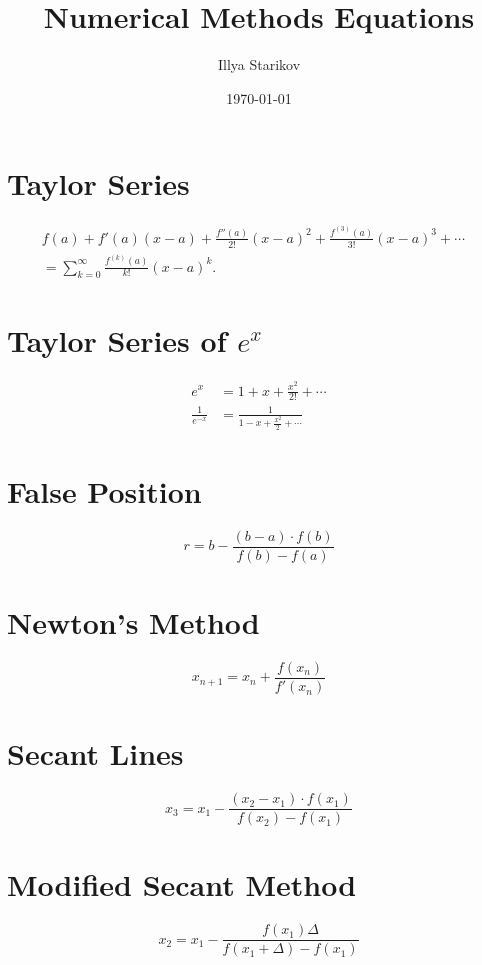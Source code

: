 \documentclass[11pt]{article}
\title{Numerical Methods Equations}
\date{\today}
\author{Illya Starikov}
\begin{document}
\maketitle

\section{Taylor Series}
\begin{align}
    f(a) + f'(a)(x - a) + \frac{f''(a)}{2!}(x - a)^2 + \frac{f^{(3)}(a)}{3!}(x - a)^3 + \cdots & \\ = \sum ^{\infty} _{k = 0} \frac{f^{(k)}(a)}{k!}(x - a)^k.
\end{align}

\section{Taylor Series of $e^x$}
\begin{align}
    e^x &= 1 + x + \frac{x^2}{2!} + \cdots \\
    \frac{1}{e^{-x}} &= \frac{1}{1 - x + \frac{x^2}{2} +\cdots }
\end{align}


\section{False Position}
\begin{equation}
    r = b - \frac{(b - a) \cdot f(b)}{f(b) - f(a)}
\end{equation}

\section{Newton's Method}
\begin{equation}
    x_{n + 1} = x_n + \frac{f(x_n)}{f'(x_n)}
\end{equation}


\section{Secant Lines}
\begin{equation}
    x_3 = x_1 - \frac{(x_2 - x_1) \cdot f(x_1)}{f(x_2) - f(x_1)}
\end{equation}

\section{Modified Secant Method}
\begin{equation}
    x_2 = x_1 - \frac{f(x_1) \Delta}{f(x_1+\Delta) - f(x_1)}
\end{equation}
\end{document}

